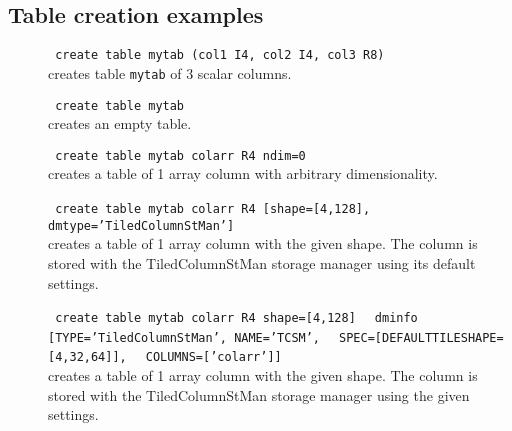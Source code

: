 \subsection{\label{TAQL:CREAEXAMPLES}Table creation examples}
\begin{description}
  \item[] \texttt{ create table mytab (col1 I4, col2 I4, col3 R8) }
      \\creates table \texttt{mytab} of 3 scalar columns.

  \item[] \texttt{ create table mytab }
      \\creates an empty table.

  \item[] \texttt{ create table mytab colarr R4 ndim=0 }
      \\creates a table of 1 array column with arbitrary dimensionality.

  \item[] \texttt{ create table mytab colarr R4 [shape=[4,128], }
          \texttt{                   dmtype='TiledColumnStMan'] }
      \\creates a table of 1 array column with the given shape.
        The column is stored with the TiledColumnStMan storage manager
        using its default settings.

  \item[] \texttt{ create table mytab colarr R4 shape=[4,128] }
          \texttt{   dminfo [TYPE='TiledColumnStMan', NAME='TCSM', }
          \texttt{           SPEC=[DEFAULTTILESHAPE=[4,32,64]], }
          \texttt{           COLUMNS=['colarr']]}
      \\creates a table of 1 array column with the given shape.
        The column is stored with the TiledColumnStMan storage manager
        using the given settings.
\end{description}

